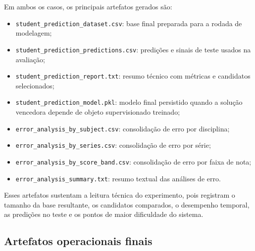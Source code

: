 Em ambos os casos, os principais artefatos gerados s\~ao:
\begin{itemize}
    \item \texttt{student\_prediction\_dataset.csv}: base final preparada para a rodada de modelagem;
    \item \texttt{student\_prediction\_predictions.csv}: predi\c{c}\~oes e sinais de teste usados na avalia\c{c}\~ao;
    \item \texttt{student\_prediction\_report.txt}: resumo t\'ecnico com m\'etricas e candidatos selecionados;
    \item \texttt{student\_prediction\_model.pkl}: modelo final persistido quando a solu\c{c}\~ao vencedora depende de objeto supervisionado treinado;
    \item \texttt{error\_analysis\_by\_subject.csv}: consolida\c{c}\~ao de erro por disciplina;
    \item \texttt{error\_analysis\_by\_series.csv}: consolida\c{c}\~ao de erro por s\'erie;
    \item \texttt{error\_analysis\_by\_score\_band.csv}: consolida\c{c}\~ao de erro por faixa de nota;
    \item \texttt{error\_analysis\_summary.txt}: resumo textual das an\'alises de erro.
\end{itemize}

Esses artefatos sustentam a leitura t\'ecnica do experimento, pois registram o tamanho da base resultante, os candidatos comparados, o desempenho temporal, as predi\c{c}\~oes no teste e os pontos de maior dificuldade do sistema.

\subsection{Artefatos operacionais finais}

